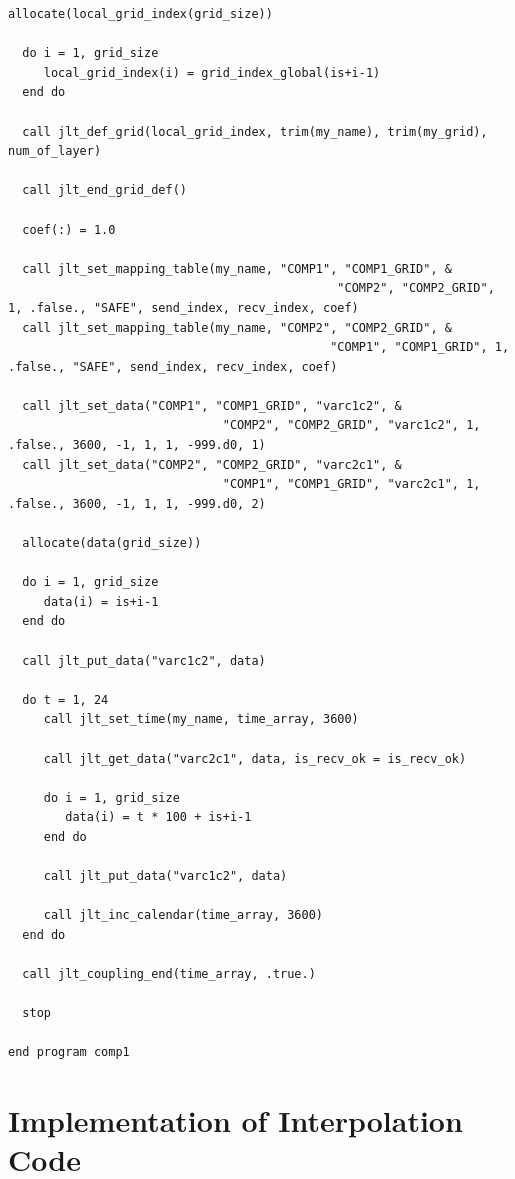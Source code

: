 \documentclass[11pt,a4paper]{report}
\begin{document}
\begin{lstlisting}[caption=Code of the toy model, label=list:code_toy]
  allocate(local_grid_index(grid_size))

  do i = 1, grid_size
     local_grid_index(i) = grid_index_global(is+i-1)
  end do

  call jlt_def_grid(local_grid_index, trim(my_name), trim(my_grid), num_of_layer)

  call jlt_end_grid_def()

  coef(:) = 1.0

  call jlt_set_mapping_table(my_name, "COMP1", "COMP1_GRID", &
                                              "COMP2", "COMP2_GRID", 1, .false., "SAFE", send_index, recv_index, coef)
  call jlt_set_mapping_table(my_name, "COMP2", "COMP2_GRID", &
                                             "COMP1", "COMP1_GRID", 1, .false., "SAFE", send_index, recv_index, coef)

  call jlt_set_data("COMP1", "COMP1_GRID", "varc1c2", &
                              "COMP2", "COMP2_GRID", "varc1c2", 1, .false., 3600, -1, 1, 1, -999.d0, 1)
  call jlt_set_data("COMP2", "COMP2_GRID", "varc2c1", &
                              "COMP1", "COMP1_GRID", "varc2c1", 1, .false., 3600, -1, 1, 1, -999.d0, 2)

  allocate(data(grid_size))

  do i = 1, grid_size
     data(i) = is+i-1
  end do

  call jlt_put_data("varc1c2", data)

  do t = 1, 24
     call jlt_set_time(my_name, time_array, 3600)

     call jlt_get_data("varc2c1", data, is_recv_ok = is_recv_ok)

     do i = 1, grid_size
        data(i) = t * 100 + is+i-1
     end do

     call jlt_put_data("varc1c2", data)

     call jlt_inc_calendar(time_array, 3600)
  end do

  call jlt_coupling_end(time_array, .true.)

  stop

end program comp1
\end{lstlisting}



\chapter{Implementation of Interpolation Code}
\end{document}
